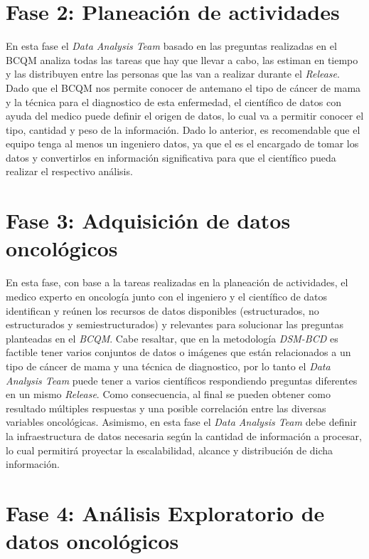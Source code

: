 \section{Fase 2: Planeación de actividades}
En esta fase el \textit{Data Analysis Team} basado en las preguntas realizadas en el BCQM analiza todas las tareas que hay que llevar a cabo, las estiman en tiempo y las distribuyen entre las personas que las van a realizar durante el \textit{Release}. Dado que el BCQM nos permite conocer de antemano el tipo de cáncer de mama y la técnica para el diagnostico de esta enfermedad, el científico de datos con ayuda del medico puede definir el origen de datos, lo cual va a permitir conocer el tipo, cantidad y peso de la información. Dado lo anterior, es recomendable que el equipo tenga al menos un ingeniero datos, ya que el es el encargado de tomar los datos y convertirlos en información significativa para que el científico pueda realizar el respectivo análisis.   

\section{Fase 3: Adquisición de datos oncológicos}
En esta fase, con base a la tareas realizadas en la planeación de actividades, el medico experto en oncología junto con el ingeniero y el científico de datos identifican y reúnen los recursos de datos disponibles (estructurados, no estructurados y semiestructurados) y relevantes para solucionar las preguntas planteadas en el \textit{BCQM}. Cabe resaltar, que en la metodología \textit{\textit{DSM-BCD}} es factible tener varios conjuntos de datos o imágenes que están relacionados a un tipo de cáncer de mama y una técnica de diagnostico, por lo tanto  el \textit{Data Analysis Team} puede tener a varios científicos respondiendo preguntas diferentes en un mismo \textit{Release}. Como consecuencia, al final se pueden obtener como resultado múltiples respuestas y una posible correlación entre las diversas variables oncológicas.  Asimismo, en esta fase el \textit{Data Analysis Team} debe definir la infraestructura de datos necesaria según la cantidad de información a procesar, lo cual permitirá proyectar la escalabilidad, alcance y distribución de dicha información. 

\section{Fase 4: Análisis Exploratorio de datos oncológicos}


